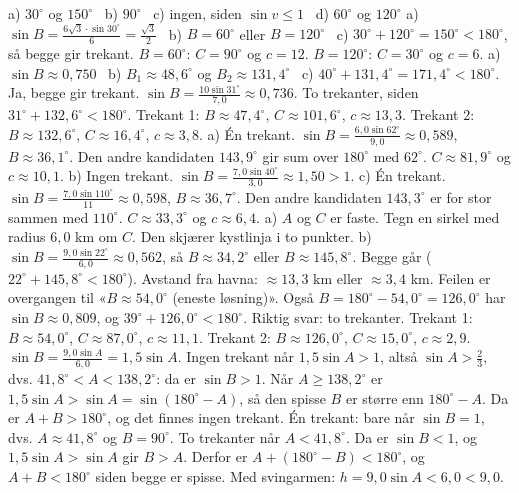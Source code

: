  a) $30^\circ$ og $150^\circ$ \ b) $90^\circ$ \ c) ingen, siden $\sin v \le 1$ \ d) $60^\circ$ og $120^\circ$
 a) $\sin B = \frac{6\sqrt3 \cdot \sin 30^\circ}{6} = \frac{\sqrt3}{2}$ \ b) $B = 60^\circ$ eller $B = 120^\circ$ \ c) $30^\circ + 120^\circ = 150^\circ < 180^\circ$, så begge gir trekant. $B = 60^\circ$: $C = 90^\circ$ og $c = 12$. $B = 120^\circ$: $C = 30^\circ$ og $c = 6$.
 a) $\sin B \approx 0,750$ \ b) $B_1 \approx 48,6^\circ$ og $B_2 \approx 131,4^\circ$ \ c) $40^\circ + 131,4^\circ = 171,4^\circ < 180^\circ$. Ja, begge gir trekant.
 $\sin B = \frac{10\sin 31^\circ}{7,0} \approx 0,736$. To trekanter, siden $31^\circ + 132,6^\circ < 180^\circ$.
Trekant 1: $B \approx 47,4^\circ$, $C \approx 101,6^\circ$, $c \approx 13,3$.
Trekant 2: $B \approx 132,6^\circ$, $C \approx 16,4^\circ$, $c \approx 3,8$.
 a) Én trekant. $\sin B = \frac{6,0\sin 62^\circ}{9,0} \approx 0,589$, $B \approx 36,1^\circ$. Den andre kandidaten $143,9^\circ$ gir sum over $180^\circ$ med $62^\circ$. $C \approx 81,9^\circ$ og $c \approx 10,1$.
b) Ingen trekant. $\sin B = \frac{7,0 \sin 40^\circ}{3,0} \approx 1,50 > 1$.
c) Én trekant. $\sin B = \frac{7,0\sin 110^\circ}{11} \approx 0,598$, $B \approx 36,7^\circ$. Den andre kandidaten $143,3^\circ$ er for stor sammen med $110^\circ$. $C \approx 33,3^\circ$ og $c \approx 6,4$.
 a) $A$ og $C$ er faste. Tegn en sirkel med radius $6,0$ km om $C$. Den skjærer kystlinja i to punkter. b) $\sin B = \frac{9,0 \sin 22^\circ}{6,0} \approx 0,562$, så $B \approx 34,2^\circ$ eller $B \approx 145,8^\circ$. Begge går ($22^\circ + 145,8^\circ < 180^\circ$). Avstand fra havna: $\approx 13,3$ km eller $\approx 3,4$ km.
 Feilen er overgangen til «$B \approx 54,0^\circ$ (eneste løsning)». Også $B = 180^\circ - 54,0^\circ = 126,0^\circ$ har $\sin B \approx 0,809$, og $39^\circ + 126,0^\circ < 180^\circ$. Riktig svar: to trekanter.
Trekant 1: $B \approx 54,0^\circ$, $C \approx 87,0^\circ$, $c \approx 11,1$.
Trekant 2: $B \approx 126,0^\circ$, $C \approx 15,0^\circ$, $c \approx 2,9$.
 $\sin B = \frac{9,0 \sin A}{6,0} = 1,5\sin A$.
Ingen trekant når $1,5 \sin A > 1$, altså $\sin A > \frac23$, dvs. $41,8^\circ < A < 138,2^\circ$: da er $\sin B > 1$. Når $A \ge 138,2^\circ$ er $1,5\sin A > \sin A = \sin(180^\circ - A)$, så den spisse $B$ er større enn $180^\circ - A$. Da er $A + B > 180^\circ$, og det finnes ingen trekant.
Én trekant: bare når $\sin B = 1$, dvs. $A \approx 41,8^\circ$ og $B = 90^\circ$.
To trekanter når $A < 41,8^\circ$. Da er $\sin B < 1$, og $1,5\sin A > \sin A$ gir $B > A$. Derfor er $A + (180^\circ - B) < 180^\circ$, og $A + B < 180^\circ$ siden begge er spisse. Med svingarmen: $h = 9,0\sin A < 6,0 < 9,0$.
